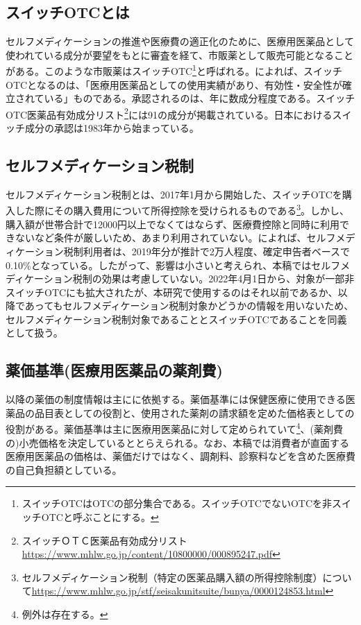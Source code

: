 \documentclass[a4paper,11pt,uplatex]{jsarticle}
\theoremstyle{definition}
\begin{document}
\subsection{スイッチOTCとは}
セルフメディケーションの推進や医療費の適正化のために、医療用医薬品として使われている成分が要望をもとに審査を経て、市販薬として販売可能となることがある。このような市販薬はスイッチOTC\footnote{スイッチOTCはOTCの部分集合である。スイッチOTCでないOTCを非スイッチOTCと呼ぶことにする。}と呼ばれる。\cite{jmsi2020}によれば、スイッチOTCとなるのは、「医療用医薬品としての使用実績があり、有効性・安全性が確立されている」ものである。承認されるのは、年に数成分程度である。スイッチOTC医薬品有効成分リスト\footnote{スイッチＯＴＣ医薬品有効成分リスト\url{https://www.mhlw.go.jp/content/10800000/000895247.pdf}}には91の成分が掲載されている。日本におけるスイッチ成分の承認は1983年から始まっている。
\subsection{セルフメディケーション税制}
セルフメディケーション税制とは、2017年1月から開始した、スイッチOTCを購入した際にその購入費用について所得控除を受けられるものである\footnote{セルフメディケーション税制（特定の医薬品購入額の所得控除制度）について\url{https://www.mhlw.go.jp/stf/seisakunitsuite/bunya/0000124853.html}}。しかし、購入額が世帯合計で12000円以上でなくてはならず、医療費控除と同時に利用できないなど条件が厳しいため、あまり利用されていない。\cite{jmsi2021}によれば、セルフメディケーション税制利用者は、2019年分が推計で2万人程度、確定申告者ベースで0.10\%となっている。したがって、影響は小さいと考えられ、本稿ではセルフメディケーション税制の効果は考慮していない。2022年4月1日から、対象が一部非スイッチOTCにも拡大されたが、本研究で使用するのはそれ以前であるか、以降であってもセルフメディケーション税制対象かどうかの情報を用いないため、セルフメディケーション税制対象であることとスイッチOTCであることを同義として扱う。
\subsection{薬価基準(医療用医薬品の薬剤費)}
以降の薬価の制度情報は主に\cite{takahashi}に依拠する。薬価基準には保健医療に使用できる医薬品の品目表としての役割と、使用された薬剤の請求額を定めた価格表としての役割がある。薬価基準は主に医療用医薬品に対して定められていて\footnote{例外は存在する。}、(薬剤費の)小売価格を決定しているととらえられる。なお、本稿では消費者が直面する医療用医薬品の価格は、薬価だけではなく、調剤料、診察料などを含めた医療費の自己負担額としている。
\end{document}
